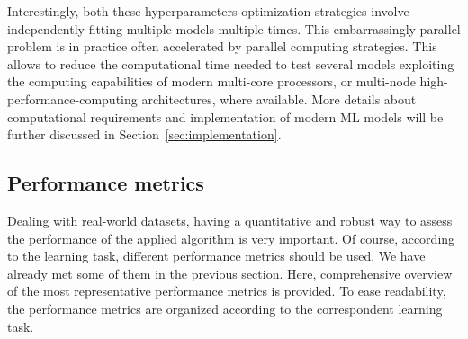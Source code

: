   Interestingly, both these hyperparameters optimization strategies involve independently fitting multiple models multiple times. This embarrassingly parallel problem is in practice often accelerated by parallel computing strategies. This allows to reduce the computational time needed to test several models exploiting the computing capabilities of modern multi-core processors, or multi-node high-performance-computing architectures, where available. More details about computational requirements and implementation of modern ML models will be further discussed in Section~\ref{sec:implementation}.


    \subsection{Performance metrics} \label{sec:performance_metrics}
    Dealing with real-world datasets, having a quantitative and robust way to assess the performance of the applied algorithm is very important. Of course, according to the learning task, different performance metrics should be used. We have already met some of them in the previous section. Here, comprehensive overview of the most representative performance metrics is provided. To ease readability, the performance metrics are organized according to the correspondent learning task.
    
